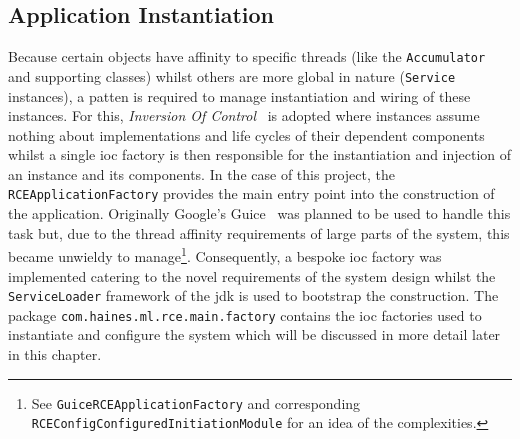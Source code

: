 \documentclass[a4paper,11pt]{scrreprt}
\begin{document}
\subsection{Application Instantiation}
Because certain objects have affinity to specific threads (like the \verb|Accumulator| and supporting classes) whilst others are more global in nature (\verb|Service| instances), a patten is required to manage instantiation and wiring of these instances. For this, \textit{Inversion Of Control}~\cite{ioc} is adopted where instances assume nothing about implementations and life cycles of their dependent components whilst a single \acrshort{ioc} factory is then responsible for the instantiation and injection of an instance and its components. In the case of this project, the \verb|RCEApplicationFactory| provides the main entry point into the construction of the application. Originally Google's Guice~\cite{guice} was planned to be used to handle this task but, due to the thread affinity requirements of large parts of the system, this became unwieldy to manage\footnote{See \verb|GuiceRCEApplicationFactory| and corresponding \verb|RCEConfigConfiguredInitiationModule| for an idea of the complexities.}. Consequently, a bespoke \acrshort{ioc} factory was implemented catering to the novel requirements of the system design whilst the \verb|ServiceLoader| framework of the \acrshort{jdk} is used to bootstrap the construction. The package \verb|com.haines.ml.rce.main.factory| contains the \acrshort{ioc} factories used to instantiate and configure the system which will be discussed in more detail later in this chapter.
\end{document}
